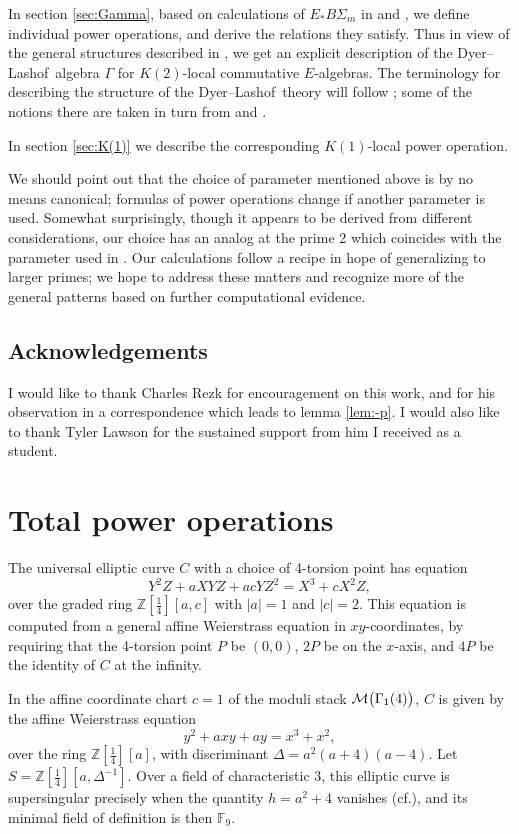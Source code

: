 \documentclass{gtpart}
\theoremstyle{definition}
\theoremstyle{remark}
\newcommand{\mb}[1]{\mathbb{#1}}
\newcommand{\cff}[2]{cf.\thinspace{\cite[#1]{#2}}}
\newcommand{\DL}{Dyer--Lashof~}
\newcommand{\BF}{{\mb F}}
\newcommand{\BZ}{{\mb Z}}
\newcommand{\CM}{{\cal M}}
\newcommand{\G}{\Gamma}
\begin{document}
In section \ref{sec:Gamma}, based on calculations of $E_* B\Sigma_m$ in \cite{ST} and \cite{Str98}, 
we define individual power operations, and derive the relations they satisfy.  
Thus in view of the general structures described in \cite{cong}, 
we get an explicit description of the \DL algebra $\G$ for $K(2)$-local commutative $E$-algebras.  
The terminology for describing the structure of the \DL theory will follow \cite{cong, h2p2}; 
some of the notions there are taken in turn from \cite{BW} and \cite{V}.  

In section \ref{sec:K(1)} we describe the corresponding $K(1)$-local power operation.  

We should point out that the choice of parameter mentioned above is by no means canonical; 
formulas of power operations change if another parameter is used.  
Somewhat surprisingly, though it appears to be derived from different considerations, 
our choice has an analog at the prime 2 which coincides with the parameter used in \cite{h2p2}.  
Our calculations follow a recipe in hope of generalizing to larger primes; 
we hope to address these matters and recognize more of the general patterns based on further computational evidence.  


\subsection*{Acknowledgements}

I would like to thank Charles Rezk for encouragement on this work, and for his observation in a correspondence which leads to lemma \ref{lem:-p}.  
I would also like to thank Tyler Lawson for the sustained support from him I received as a student.  


\section{Total power operations}
\label{sec:psi}

The universal elliptic curve $C$ with a choice of 4-torsion point has equation 
\[
 Y^2 Z + a X Y Z + a c Y Z^2 = X^3 + c X^2 Z, 
\]
over the graded ring $\BZ [\frac{1}{4}] [a,c]$ with $|a| = 1$ and $|c| = 2$.  
This equation is computed from a general affine Weierstrass equation in $xy$-coordinates, 
by requiring that the 4-torsion point $P$ be $(0,0)$, $2P$ be on the $x$-axis, and $4P$ be the identity of $C$ at the infinity.  

In the affine coordinate chart $c = 1$ of the moduli stack $\CM \big(\G_1(4)\big)$, 
$C$ is given by the affine Weierstrass equation 
\[
 y^2 + a x y + a y = x^3 + x^2, 
\]
over the ring $\BZ [\frac{1}{4}] [a]$, with discriminant $\Delta = a^2 (a + 4) (a - 4)$.  
Let $S = \BZ [\frac{1}{4}] [a, \Delta^{-1}]$.  
Over a field of characteristic 3, this elliptic curve is supersingular precisely when the quantity $h = a^2 + 4$ vanishes (\cff{V.4.1a}{AEC}), 
and its minimal field of definition is then $\BF_9$.  
\end{document}
